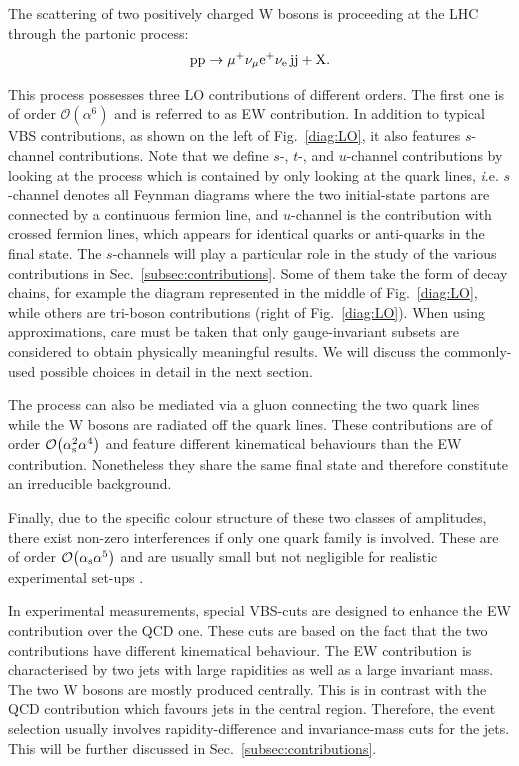The scattering of two positively charged W bosons is proceeding at the LHC through the partonic process:
%
\begin{equation}
\text{p}\text{p}\to\mu^+\nu_\mu{\rm e}^+\nu_{\rm e}\,\text{j}\text{j}+\mathrm{X}.
\end{equation}

This process possesses three LO contributions of different orders.
The first one is of order $\mathcal{O}{\left(\alpha^{6}\right)}$ and is referred to as EW contribution.
In addition to typical VBS contributions, as shown on the left of Fig.~\ref{diag:LO}, it also features $s$-channel contributions.
Note that we define $s$-, $t$-, and $u$-channel contributions by looking at the process which is contained by only looking at the quark lines, {\emph i.e.} $s$-channel denotes all Feynman diagrams where the two initial-state partons are connected by a continuous fermion line, and $u$-channel is the contribution with crossed fermion lines, which appears for identical quarks or anti-quarks in the final state.
The $s$-channels will play a particular role in the study of the various contributions in Sec.~\ref{subsec:contributions}.
Some of them take the form of decay chains, for example the diagram represented in the middle of Fig.~\ref{diag:LO}, while others are tri-boson contributions (right of Fig.~\ref{diag:LO}).
When using approximations, care must be taken that only gauge-invariant subsets are considered to obtain physically meaningful results. We will discuss the commonly-used possible choices in detail in the next section.

The process can also be mediated via a gluon connecting the two quark lines while the W bosons are radiated off the quark lines.
These contributions are of order $\mathcal{O}{\left(\alpha_\text{s}^{2}\alpha^{4}\right)}$ and feature different kinematical behaviours than the EW contribution.
Nonetheless they share the same final state and therefore constitute an irreducible background.

Finally, due to the specific colour structure of these two classes of amplitudes, there exist non-zero interferences if only one quark family is involved.
These are of order $\mathcal{O}{\left(\alpha_{\rm s}\alpha^{5}\right)}$ and are usually small but not negligible for realistic experimental set-ups \cite{Biedermann:2017bss}.

In experimental measurements, special VBS-cuts are designed to enhance the EW contribution over the QCD one.
These cuts are based on the fact that the two contributions have different kinematical behaviour.
The EW contribution is characterised by two jets with large rapidities as well as a large invariant mass.
The two W bosons are mostly produced centrally.
This is in contrast with the QCD contribution which favours jets in the central region.
Therefore, the event selection usually involves rapidity-difference and invariance-mass cuts for the jets.
This will be further discussed in Sec.~\ref{subsec:contributions}.

